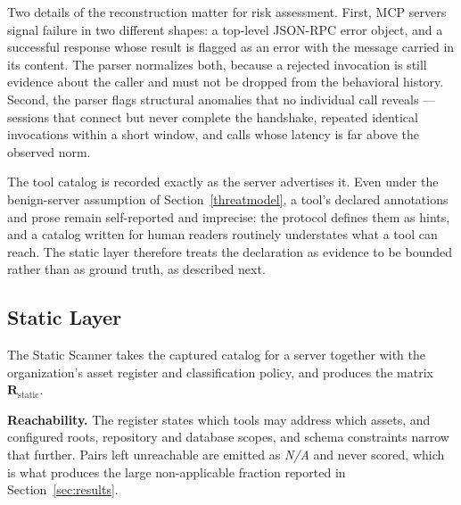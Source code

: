 \documentclass[sigconf]{acmart}
\begin{document}
Two details of the reconstruction matter for risk assessment. First, MCP
servers signal failure in two different shapes: a top-level JSON-RPC error
object, and a successful response whose result is flagged as an error with the
message carried in its content. The parser normalizes both, because a rejected
invocation is still evidence about the caller and must not be dropped from the
behavioral history. Second, the parser flags structural anomalies that no
individual call reveals --- sessions that connect but never complete the
handshake, repeated identical invocations within a short window, and calls
whose latency is far above the observed norm.

The tool catalog is recorded exactly as the server advertises it. Even under
the benign-server assumption of Section~\ref{threatmodel}, a tool's declared
annotations and prose remain self-reported and imprecise: the protocol defines
them as hints, and a catalog written for human readers routinely understates
what a tool can reach. The static layer therefore treats the declaration as
evidence to be bounded rather than as ground truth, as described next.


\subsection{Static Layer}
\label{sec:impl-static}

The Static Scanner takes the captured catalog for a server together with the
organization's asset register and classification policy, and produces the
matrix $\mathbf{R}_{\mathrm{static}}$.

\textbf{Reachability.} The register states which tools may address which
assets, and configured roots, repository and database scopes, and schema
constraints narrow that further. Pairs left unreachable are emitted as
\emph{N/A} and never scored, which is what produces the large non-applicable
fraction reported in Section~\ref{sec:results}.
\end{document}
